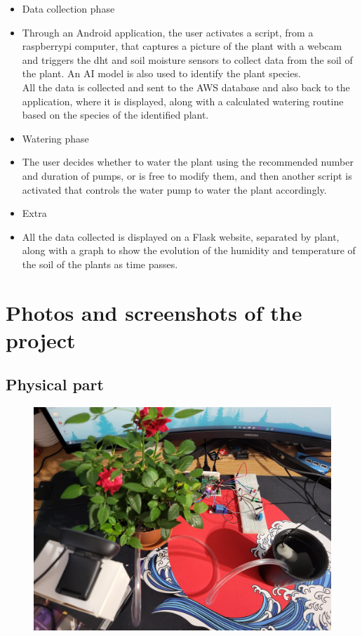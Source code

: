 \documentclass[12pt]{article}
\begin{document}
\begin{itemize}[leftmargin=2cm]
    \item Data collection phase
    \item[] Through an Android application, the user activates a script, from a raspberrypi computer, that captures a picture of the plant with a webcam and triggers the dht and soil moisture sensors to collect data from the soil of the plant. An AI model is also used to identify the plant species. \\
    All the data is collected and sent to the AWS database and also back to the application, where it is displayed, along with a calculated watering routine based on the species of the identified plant. 
    \item Watering phase
    \item[] The user decides whether to water the plant using the recommended number and duration of pumps, or is free to modify them, and then another script is activated that controls the water pump to water the plant accordingly. 
    \item Extra
    \item[] All the data collected is displayed on a Flask website, separated by plant, along with a graph to show the evolution of the humidity and temperature of the soil of the plants as time passes.
\end{itemize}

\newpage

\section{Photos and screenshots of the project}
\subsection{Physical part}

\begin{figure}[ht]
    \centering
    \includegraphics[width=1\textwidth]{images/image13.jpeg}
\end{figure} 
\end{document}

